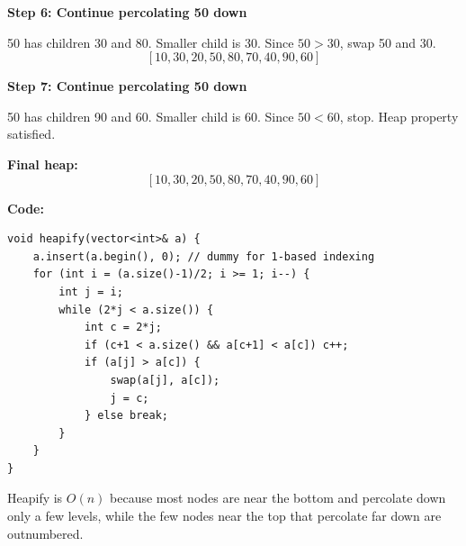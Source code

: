 \documentclass{article}
\begin{document}
\textbf{Step 6: Continue percolating 50 down}

50 has children 30 and 80. Smaller child is 30. Since $50 > 30$, swap 50 and 30.
\[
[10,30,20,50,80,70,40,90,60]
\]
\begin{center}
\end{center}

\textbf{Step 7: Continue percolating 50 down}

50 has children 90 and 60. Smaller child is 60. Since $50 < 60$, stop. Heap property satisfied.

\textbf{Final heap:}
\[
[10,30,20,50,80,70,40,90,60]
\]
\begin{center}
\end{center}
\textbf{Code:}
\begin{verbatim}
void heapify(vector<int>& a) {
    a.insert(a.begin(), 0); // dummy for 1-based indexing
    for (int i = (a.size()-1)/2; i >= 1; i--) {
        int j = i;
        while (2*j < a.size()) {
            int c = 2*j;
            if (c+1 < a.size() && a[c+1] < a[c]) c++;
            if (a[j] > a[c]) {
                swap(a[j], a[c]);
                j = c;
            } else break;
        }
    }
}
\end{verbatim}

Heapify is $O(n)$ because most nodes are near the bottom and percolate down only a few levels, while the few nodes near the top that percolate far down are outnumbered.
\end{document}
